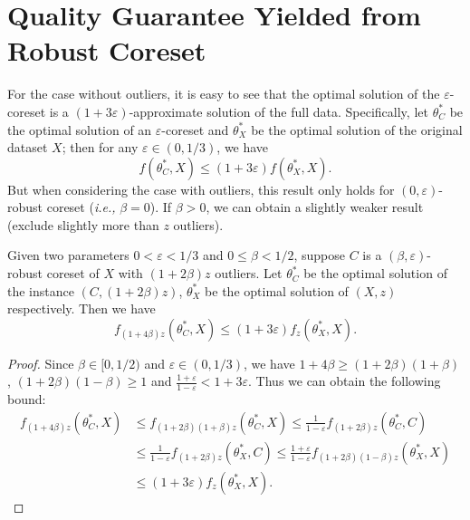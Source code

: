 \section{Quality Guarantee Yielded from  Robust Coreset}
\label{supp:quality}

For the case without outliers, it is easy to see that the optimal solution of the $\varepsilon$-coreset is a $(1+3\varepsilon)$-approximate solution of the full data. Specifically, let $ \theta_C^* $ be the optimal solution of an $\varepsilon$-coreset and $ \theta_X^* $ be the optimal solution of the original dataset $X$; then for any  $\varepsilon \in (0, 1/3)$, we have
\begin{equation}
    f(\theta_C^*,X)\leq (1+3\varepsilon)f(\theta_X^*,X).
\end{equation}
But when considering the case with  outliers, this result only holds for $ (0,\varepsilon) $-robust coreset ({\em i.e.,} $\beta=0$). 
If $ \beta > 0 $, we can obtain a slightly weaker result (exclude slightly more than $z$ outliers). 

\begin{lemma}
Given two parameters $ 0<\varepsilon<1/3 $ and $ 0\leq \beta < 1/2 $, suppose $C$ is a $(\beta,\varepsilon)$-robust coreset of $ X $ with $(1+2\beta)z $ outliers. Let
$ \theta_C^* $ be the optimal solution of the instance $ (C,(1+2\beta)z) $, $ \theta_X^* $ be the optimal solution of $ (X,z) $ respectively.
Then we have
\begin{equation}
    f_{(1+4\beta)z}(\theta_C^*,X)\leq (1+3\varepsilon)f_z(\theta_X^*,X).
\end{equation}
\end{lemma}
\begin{proof}
Since $ \beta\in [0,1/2) $ and $ \varepsilon \in (0,1/3) $, we have $ {1+4\beta}\geq (1+2\beta)(1+\beta) $, $ (1+2\beta)(1-\beta) \geq 1 $ and $ \frac{1+\varepsilon}{1-\varepsilon}<1+3\varepsilon $. Thus we can obtain the following bound:
    \begin{align*}
    f_{(1+4\beta)z}(\theta_C^*,X)&\leq f_{(1+2\beta)(1+\beta)z}(\theta_C^*,X)\leq \frac{1}{1-\varepsilon}f_{(1+2\beta)z}(\theta_C^*,C)\\
    &\leq \frac{1}{1-\varepsilon}f_{(1+2\beta)z}(\theta_X^*,C)\leq \frac{1+\varepsilon}{1-\varepsilon}f_{(1+2\beta)(1-\beta)z}(\theta_X^*,X)\\
    &\leq (1+3\varepsilon)f_z(\theta_X^*,X).
    \end{align*}
\end{proof}






